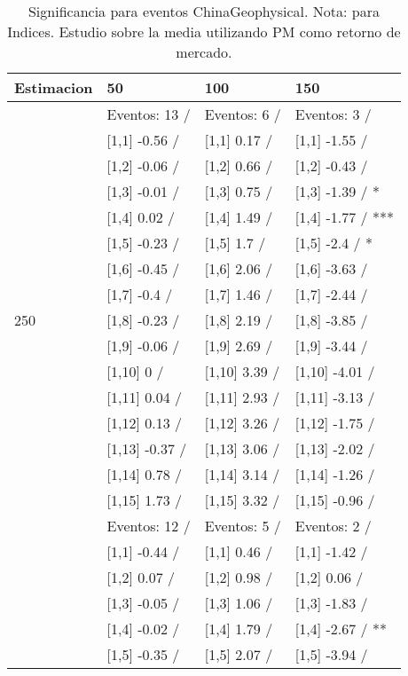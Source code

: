 \begin{table}

\caption{Significancia para eventos ChinaGeophysical. Nota: para Indices. Estudio sobre la media utilizando PM como retorno de mercado.}
\centering
\begin{tabular}[t]{llll}
\toprule
Estimacion & 50 & 100 & 150\\
\midrule
 & Eventos:  13 / & Eventos:  6 / & Eventos:  3 /\\
 & {}[1,1] -0.56  / & {}[1,1] 0.17  / & {}[1,1] -1.55  /\\
 & {}[1,2] -0.06  / & {}[1,2] 0.66  / & {}[1,2] -0.43  /\\
 & {}[1,3] -0.01  / & {}[1,3] 0.75  / & {}[1,3] -1.39  / *\\
 & {}[1,4] 0.02  / & {}[1,4] 1.49  / & {}[1,4] -1.77  / ***\\
\addlinespace
 & {}[1,5] -0.23  / & {}[1,5] 1.7  / & {}[1,5] -2.4  / *\\
 & {}[1,6] -0.45  / & {}[1,6] 2.06  / & {}[1,6] -3.63  /\\
 & {}[1,7] -0.4  / & {}[1,7] 1.46  / & {}[1,7] -2.44  /\\
250 & {}[1,8] -0.23  / & {}[1,8] 2.19  / & {}[1,8] -3.85  /\\
 & {}[1,9] -0.06  / & {}[1,9] 2.69  / & {}[1,9] -3.44  /\\
\addlinespace
 & {}[1,10] 0  / & {}[1,10] 3.39  / & {}[1,10] -4.01  /\\
 & {}[1,11] 0.04  / & {}[1,11] 2.93  / & {}[1,11] -3.13  /\\
 & {}[1,12] 0.13  / & {}[1,12] 3.26  / & {}[1,12] -1.75  /\\
 & {}[1,13] -0.37  / & {}[1,13] 3.06  / & {}[1,13] -2.02  /\\
 & {}[1,14] 0.78  / & {}[1,14] 3.14  / & {}[1,14] -1.26  /\\
\addlinespace
 & {}[1,15] 1.73  / & {}[1,15] 3.32  / & {}[1,15] -0.96  /\\
 & Eventos:  12 / & Eventos:  5 / & Eventos:  2 /\\
 & {}[1,1] -0.44  / & {}[1,1] 0.46  / & {}[1,1] -1.42  /\\
 & {}[1,2] 0.07  / & {}[1,2] 0.98  / & {}[1,2] 0.06  /\\
 & {}[1,3] -0.05  / & {}[1,3] 1.06  / & {}[1,3] -1.83  /\\
\addlinespace
 & {}[1,4] -0.02  / & {}[1,4] 1.79  / & {}[1,4] -2.67  / **\\
 & {}[1,5] -0.35  / & {}[1,5] 2.07  / & {}[1,5] -3.94  /\\

\end{tabular}
\end{table}
